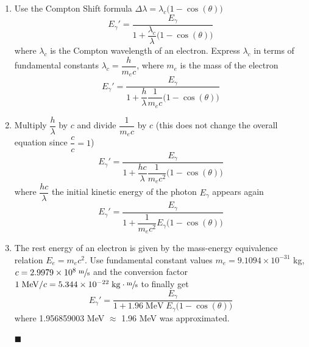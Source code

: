 \documentclass[12pt]{article}
\begin{document}
\begin{enumerate}
    \item Use the Compton Shift formula $\Delta\lambda=\lambda_c\big(1-\cos(\theta)\big)$
    $$E_\gamma'=\dfrac{E_\gamma}{1+\dfrac{\lambda_c}{\lambda}\big(1-\cos(\theta)\big)}$$
    where $\lambda_c$ is the Compton wavelength of an electron.
    Express $\lambda_c$ in terms of fundamental constants $\lambda_c=\dfrac{h}{m_ec}$,
    where $m_e$ is the mass of the electron
    $$E_\gamma'=\dfrac{E_\gamma}{1+\dfrac{h}{\lambda}\dfrac{1}{m_ec}\big(1-\cos(\theta)\big)}$$

    \item Multiply $\dfrac{h}{\lambda}$ by $c$ and divide $\dfrac{1}{m_ec}$ by $c$
    (this does not change the overall equation since $\dfrac{c}{c}=1$)
    $$E_\gamma'=\dfrac{E_\gamma}{1+\dfrac{hc}{\lambda}\dfrac{1}{m_ec^2}\big(1-\cos(\theta)\big)}$$
    where $\dfrac{hc}{\lambda}$ the initial kinetic energy of the photon $E_\gamma$ appears again
    $$E_\gamma'=\dfrac{E_\gamma}{1+\dfrac{1}{m_ec^2}E_\gamma\big(1-\cos(\theta)\big)}$$

    \item The rest energy of an electron is given by the mass-energy equivalence relation $E_e=m_ec^2$.
    Use fundamental constant values $m_e=9.1094\times10^{-31}$ kg, $c=2.9979\times10^8\;\mathrm{\sfrac{m}{s}}$
    and the conversion factor $1\;\mathrm{MeV}/c=5.344\times10^{-22}\;\mathrm{kg\cdot\sfrac{m}{s}}$ to finally get
    $$E_\gamma'=\dfrac{E_\gamma}{1+1.96\;\mathrm{MeV}\;E_\gamma\big(1-\cos(\theta)\big)}$$
    where 1.956859003 MeV $\approx$ 1.96 MeV was approximated.
    
    \hfill$\blacksquare$
\end{enumerate}
\end{document}
